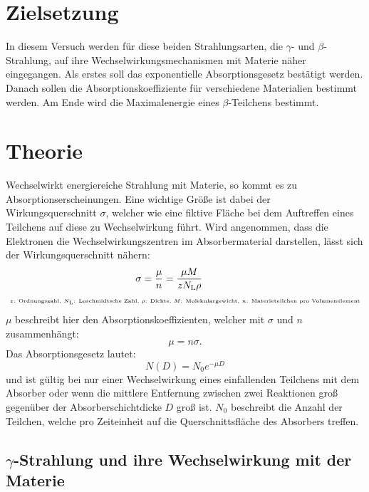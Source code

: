 \section{Zielsetzung}
\label{sec:Zielsetzung}

In diesem Versuch werden für diese beiden Strahlungsarten, die $\gamma$- und $\beta$-Strahlung, auf ihre Wechselwirkungsmechanismen mit Materie näher eingegangen. Als erstes soll das exponentielle Absorptionsgesetz bestätigt werden. Danach sollen die Absorptionskoeffiziente für verschiedene Materialien bestimmt werden. Am Ende wird die Maximalenergie eines $\beta$-Teilchens bestimmt.

\section{Theorie}
\label{sec:Theorie}

Wechselwirkt energiereiche Strahlung mit Materie, so kommt es zu Absorptionserscheinungen. Eine wichtige Größe ist dabei der Wirkungsquerschnitt $\sigma$, welcher wie eine fiktive Fläche bei dem Auftreffen eines Teilchens auf diese zu Wechselwirkung führt.
Wird angenommen, dass die Elektronen die Wechselwirkungszentren im Absorbermaterial darstellen, lässt sich der Wirkungsquerschnitt nähern:
\begin{align}
\sigma &= \frac{\mu}{n} = \frac{\mu M}{z N_\text{L} \rho} \\
\tiny \text{$z$: Ordnungszahl, $N_\text{L}$: Loschmidtsche Zahl, }&\text{\tiny $\rho$: Dichte, $M$: Molekulargewicht, $n$: Materieteilchen pro Volumenelement} \nonumber
\end{align}
$\mu$ beschreibt hier den Absorptionskoeffizienten, welcher mit $\sigma$ und $n$ zusammenhängt:
\begin{equation*}
\mu =n \sigma.
\end{equation*}
Das Absorptionsgesetz lautet:
\begin{equation}
\label{eq:eq1}
N(D) =N_0 e^{-\mu D} 
\end{equation}
und ist gültig bei nur einer Wechselwirkung eines einfallenden Teilchens mit dem Absorber oder wenn die mittlere Entfernung zwischen zwei Reaktionen groß gegenüber der Absorberschichtdicke $D$ groß ist. $N_0$ beschreibt die Anzahl der Teilchen, welche pro Zeiteinheit auf die Querschnittsfläche des Absorbers treffen. 

\subsection{\texorpdfstring{$\gamma$}{gamma}-Strahlung und ihre Wechselwirkung mit der Materie}

